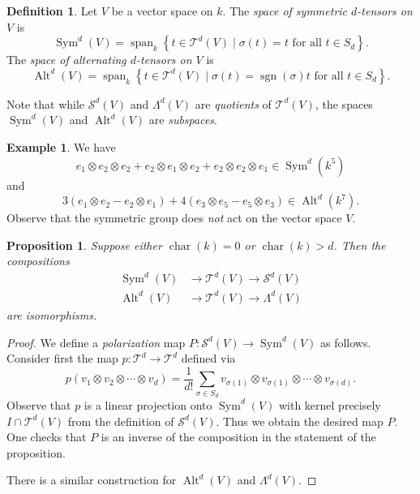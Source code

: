 \documentclass[12pt]{article}
\theoremstyle{plain}
\newtheorem{proposition}[theorem]{Proposition}
\theoremstyle{definition}
\newtheorem{definition}[theorem]{Definition}
\newtheorem{example}[theorem]{Example}
\theoremstyle{remark}
\numberwithin{equation}{section}
\begin{document}
\begin{definition}
Let $V$ be a vector space on $k$.
The \emph{space of symmetric $d$-tensors on $V$} is
\[
\operatorname{Sym}^d(V) = \operatorname{span}_k
\left\{ t \in \mathcal{T}^d(V) \mid \sigma(t)=t
\textrm{ for all } t \in S_d  \right\} .
\]
The \emph{space of alternating $d$-tensors on $V$} is
\[
\operatorname{Alt}^d(V) = \operatorname{span}_k
\left\{ t \in \mathcal{T}^d(V) \mid
\sigma(t)=\operatorname{sgn}(\sigma)t
\textrm{ for all } t \in S_d  \right\} .
\]
\end{definition}

Note that while $\mathcal{S}^d(V)$ and $\Lambda^d(V)$ are
\emph{quotients} of $\mathcal{T}^d(V)$,
the spaces $\operatorname{Sym}^d(V)$
and $\operatorname{Alt}^d(V)$
are \emph{subspaces}.

\begin{example}
We have
\[
e_1 \otimes e_2 \otimes e_2 + e_2 \otimes e_1 \otimes e_2
+ e_2 \otimes e_2 \otimes e_1 \in \operatorname{Sym}^d(k^5)
\]
and
\[
3\left(e_1 \otimes e_2 - e_2 \otimes e_1\right)
+ 4\left( e_3 \otimes e_5 - e_5 \otimes e_3 \right) 
\in \operatorname{Alt}^d(k^7).
\]
Observe that the symmetric group does \emph{not} act on the
vector space $V$.
\end{example}

\begin{proposition} \label{prop:sym_alt_good_char}
Suppose either $\operatorname{char}(k) =0$ or $\operatorname{char}(k) > d$.
Then the compositions
\begin{align*}
\operatorname{Sym}^d(V) &\to \mathcal{T}^d(V) \to \mathcal{S}^d(V)\\
\operatorname{Alt}^d(V) &\to \mathcal{T}^d(V) \to \Lambda^d(V)
\end{align*}
are isomorphisms.
\end{proposition}

\begin{proof}
We define a \emph{polarization} map
$P : \mathcal{S}^d(V) \to \operatorname{Sym}^d(V)$ as follows.
Consider first the map $p : \mathcal{T}^d \to \mathcal{T}^d$
defined via
\[
p(v_1 \otimes v_2 \otimes \cdots \otimes v_d)
= \frac{1}{d!}\sum_{\sigma \in S_d}
v_{\sigma(1)} \otimes v_{\sigma(1)} \otimes \cdots \otimes v_{\sigma(d)}
.
\]
Observe that $p$ is a linear projection onto $\operatorname{Sym}^d(V)$
with kernel precisely $I \cap \mathcal{T}^d(V)$ from the definition
of $\mathcal{S}^d(V)$.  Thus we obtain the desired map $P$.
One checks that $P$ is an inverse of the composition in the statement of
the proposition.

There is a similar construction for $\operatorname{Alt}^d(V)$
and $\Lambda^d(V)$.
\end{proof}
\end{document}
